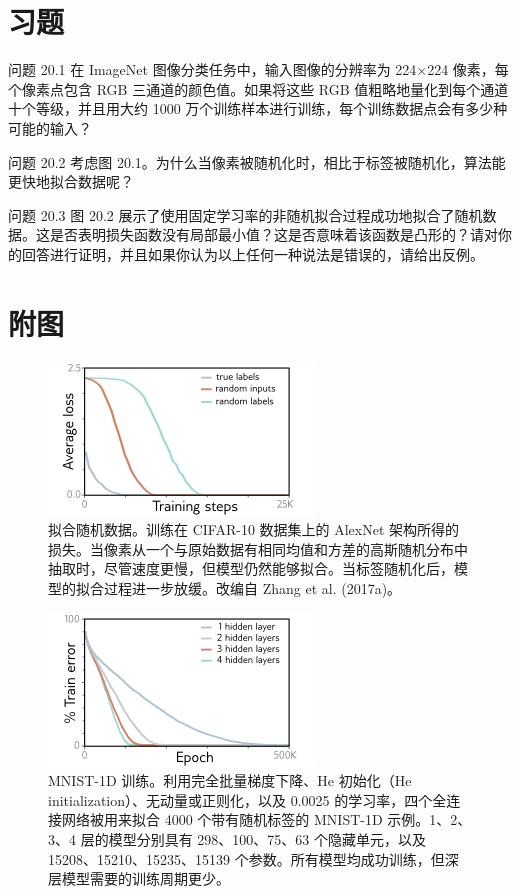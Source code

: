 \section{习题}
问题 20.1 在 ImageNet 图像分类任务中，输入图像的分辨率为 224×224 像素，每个像素点包含 RGB 三通道的颜色值。如果将这些 RGB 值粗略地量化到每个通道十个等级，并且用大约 1000 万个训练样本进行训练，每个训练数据点会有多少种可能的输入？

问题 20.2 考虑图 20.1。为什么当像素被随机化时，相比于标签被随机化，算法能更快地拟合数据呢？

问题 20.3 图 20.2 展示了使用固定学习率的非随机拟合过程成功地拟合了随机数据。这是否表明损失函数没有局部最小值？这是否意味着该函数是凸形的？请对你的回答进行证明，并且如果你认为以上任何一种说法是错误的，请给出反例。


\section{附图}

\begin{figure}[ht!]
\centering
\includegraphics[width=0.7\linewidth]{png/chapter20/WhyZhangResults.png}
\caption{拟合随机数据。训练在 CIFAR-10 数据集上的 AlexNet 架构所得的损失。当像素从一个与原始数据有相同均值和方差的高斯随机分布中抽取时，尽管速度更慢，但模型仍然能够拟合。当标签随机化后，模型的拟合过程进一步放缓。改编自 Zhang et al. (2017a)。}
\end{figure}


\begin{figure}[ht!]
\centering
\includegraphics[width=0.7\linewidth]{png/chapter20/WhyGDResults.png}
\caption{MNIST-1D 训练。利用完全批量梯度下降、He 初始化（He initialization）、无动量或正则化，以及 0.0025 的学习率，四个全连接网络被用来拟合 4000 个带有随机标签的 MNIST-1D 示例。1、2、3、4 层的模型分别具有 298、100、75、63 个隐藏单元，以及 15208、15210、15235、15139 个参数。所有模型均成功训练，但深层模型需要的训练周期更少。}
\end{figure}


